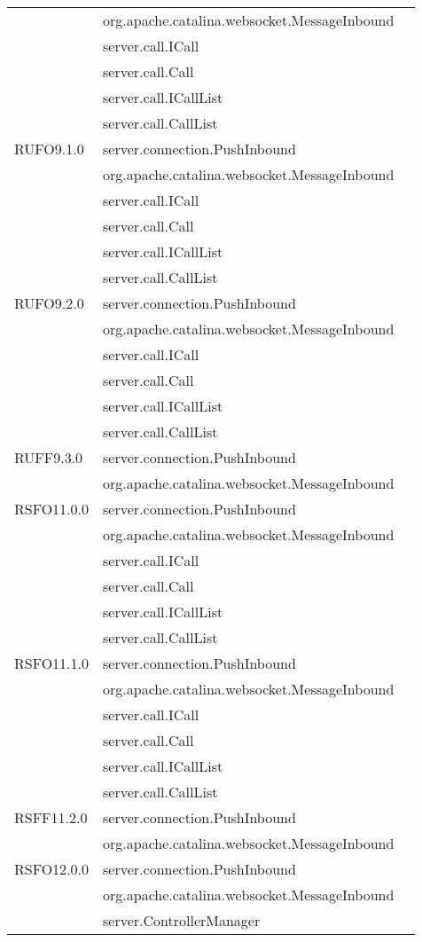 \begin{center}
\begin{longtable}{lp{}l}
& org.apache.catalina.websocket.MessageInbound\\
 & server.call.ICall\\
& server.call.Call\\
 & server.call.ICallList\\
& server.call.CallList\\
RUFO9.1.0 & server.connection.PushInbound\\
& org.apache.catalina.websocket.MessageInbound\\
 & server.call.ICall\\
& server.call.Call\\
 & server.call.ICallList\\
& server.call.CallList\\
RUFO9.2.0 & server.connection.PushInbound\\
& org.apache.catalina.websocket.MessageInbound\\
 & server.call.ICall\\
& server.call.Call\\
 & server.call.ICallList\\
& server.call.CallList\\
RUFF9.3.0 & server.connection.PushInbound\\
& org.apache.catalina.websocket.MessageInbound\\
RSFO11.0.0 & server.connection.PushInbound\\
& org.apache.catalina.websocket.MessageInbound\\
 & server.call.ICall\\
& server.call.Call\\
 & server.call.ICallList\\
& server.call.CallList\\
RSFO11.1.0 & server.connection.PushInbound\\
& org.apache.catalina.websocket.MessageInbound\\
 & server.call.ICall\\
& server.call.Call\\
 & server.call.ICallList\\
& server.call.CallList\\
RSFF11.2.0 & server.connection.PushInbound\\
& org.apache.catalina.websocket.MessageInbound\\
RSFO12.0.0 & server.connection.PushInbound\\
& org.apache.catalina.websocket.MessageInbound\\
& server.ControllerManager\\

\end{longtable}
\end{center}
